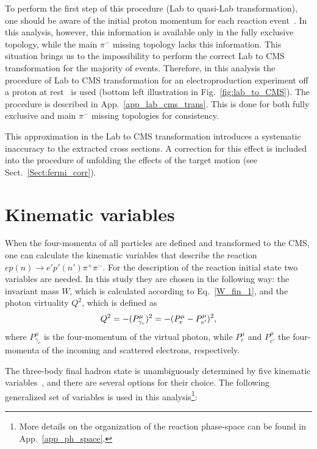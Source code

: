 To perform the first step of this procedure (Lab to quasi-Lab transformation), one should be aware of the initial proton momentum for each reaction event~\cite{twopeg-d}. In this analysis, however, this information is available only in the fully exclusive topology, while the main $\pi^{-}$ missing topology lacks this information. This situation brings us to the impossibility to perform the correct Lab to CMS transformation for the majority of events. Therefore, in this analysis the procedure of Lab to CMS transformation for an electroproduction experiment off a proton at rest~\cite{Fed_an_note:2017} is used (bottom left illustration in Fig.~\ref{fig:lab_to_CMS}). The procedure is described in App.~\ref{app_lab_cms_trans}. This is done for both fully exclusive and main $\pi^{-}$ missing topologies for consistency.

This approximation in the Lab to CMS transformation introduces a systematic inaccuracy to the extracted cross sections. A correction for this effect is included into the procedure of unfolding the effects of the target motion (see Sect.~\ref{Sect:fermi_corr}).




\section{Kinematic variables}
\label{Sect:kin_var}


When the four-momenta of all particles are defined and transformed to the CMS, one can calculate the kinematic variables that describe the reaction $ep(n) \rightarrow e'p'(n')\pi^{+}\pi^{-}$. For the description of the reaction initial state two variables are needed. In this study they are chosen in the following way: the invariant mass $W$, which is calculated according to Eq.~\eqref{W_fin_1}, and the photon virtuality $Q^{2}$, which is defined as
\vspace{-1em}
\begin{equation}
Q^{2}= -(P_{\gamma_{v}}^{\mu})^{2} = -(P_{e}^{\mu}-P_{e'}^{\mu})^{2}\\[-15pt], \label{eq:q2} 
\end{equation}
where $P_{\gamma_{v}}^{\mu}$ is the four-momentum of the virtual photon, while $P_{e}^{\mu}$ and $P_{e'}^{\mu}$ the four-momenta of the incoming and scattered electrons, respectively. 



The three-body final hadron state is unambiguously determined by five kinematic variables~\cite{Fed_an_note:2017}, and there are several options for their choice. The following generalized set of variables is used in this analysis\footnote[5]{More details on the organization of the reaction phase-space can be found in App.~\ref{app_ph_space}.}:\vspace{-0.5em}

